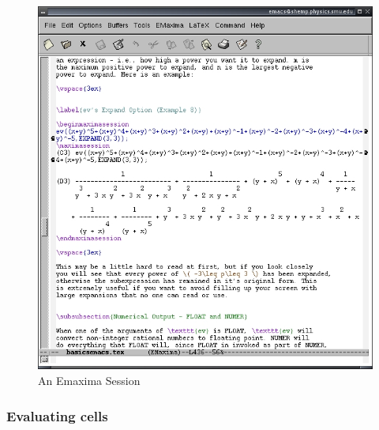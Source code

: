 \begin{figure}

\centering \includegraphics{images/emaximashot} \par
\caption{An Emaxima Session}

\end{figure}

\subsubsection{Evaluating cells}

